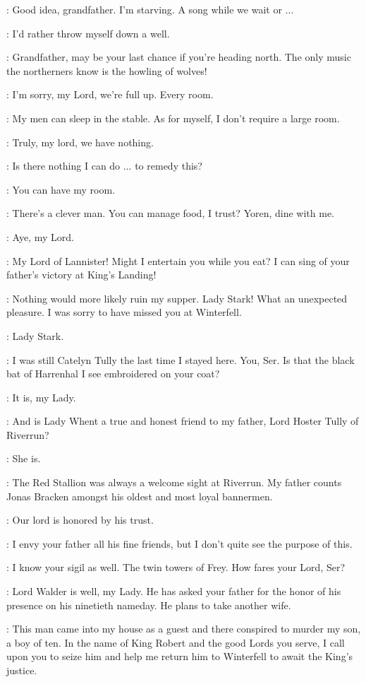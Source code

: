 \MARILLION: Good idea, grandfather. I'm starving. A song while we wait or $\ldots$

\RODRIK: I'd rather throw myself down a well. 

\MARILLION: Grandfather, may be your last chance if you're heading north. The only music the northerners know is the howling of wolves! 


\MARSHAHEDDLE: I'm sorry, my Lord, we're full up. Every room. 

\TYRION: My men can sleep in the stable. As for myself, I don't require a large room. 

\MARSHAHEDDLE: Truly, my lord, we have nothing. 

\TYRION: Is there nothing I can do $\ldots$ to remedy this? 

\BRONN: You can have my room. 

\TYRION:  There's a clever man.  You can manage food, I trust? Yoren, dine with me. 

\BRONN: Aye, my Lord. 

\MARILLION: My Lord of Lannister! Might I entertain you while you eat? I can sing of your father's victory at King's Landing! 

\TYRION: Nothing would more likely ruin my supper. Lady Stark! What an unexpected pleasure. I was sorry to have missed you at Winterfell. 

\MARSHAHEDDLE: Lady Stark. 

\CATELYN:  I was still Catelyn Tully the last time I stayed here. You, Ser. Is that the black bat of Harrenhal I see embroidered on your coat? 

\KNIGHTa: It is, my Lady. 

\CATELYN: And is Lady Whent a true and honest friend to my father, Lord Hoster Tully of Riverrun? 

\KNIGHTa: She is. 

\CATELYN: The Red Stallion was always a welcome sight at Riverrun. My father counts Jonas Bracken amongst his oldest and most loyal bannermen. 

\KNIGHTb: Our lord is honored by his trust. 

\TYRION: I envy your father all his fine friends, but I don't quite see the purpose of this. 

\CATELYN: I know your sigil as well. The twin towers of Frey. How fares your Lord, Ser? 

\KNIGHTc: Lord Walder is well, my Lady. He has asked your father for the honor of his presence on his ninetieth nameday. He plans to take another wife. 

\CATELYN: This man came into my house as a guest and there conspired to murder my son, a boy of ten. In the name of King Robert and the good Lords you serve, I call upon you to seize him and help me return him to Winterfell to await the King's justice. 


